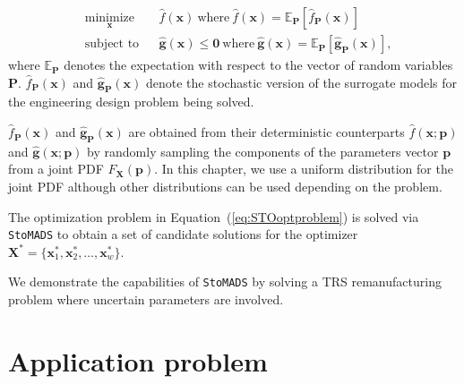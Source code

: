 \begin{equation}
	\begin{aligned}
		& \underset{\mathbf{x}}{\text{minimize}}
		& & \hat{f}(\mathbf{x})~\textrm{where}~\hat{f}(\mathbf{x})=\mathbb{E}_{\mathbf{P}}\left[\hat{f}_{\mathbf{P}}(\mathbf{x})\right]\\
		& \text{subject to}
		& & \hat{\mathbf{g}}(\mathbf{x}) \le \mathbf{0}~\textrm{where}~\hat{\mathbf{g}}(\mathbf{x})=\mathbb{E}_{\mathbf{P}}\left[\hat{\mathbf{g}}_{\mathbf{P}}(\mathbf{x})\right],
	\end{aligned}
	\label{eq:STOoptproblem}
\end{equation}
%
where $\mathbb{E}_{\mathbf{P}}$ denotes the expectation with respect to the vector of random variables $\mathbf{P}$. $\hat{f}_{\mathbf{P}}(\mathbf{x})$ and $\hat{\mathbf{g}}_{\mathbf{P}}(\mathbf{x})$ denote the stochastic version of the surrogate models for the engineering design problem being solved.

$\hat{f}_{\mathbf{P}}(\mathbf{x})$ and $\hat{\mathbf{g}}_{\mathbf{P}}(\mathbf{x})$ are obtained from their deterministic counterparts $\hat{f}(\mathbf{x};{\mathbf{p}})$ and $\hat{\mathbf{g}}(\mathbf{x};{\mathbf{p}})$ by randomly sampling the components of the parameters vector $\mathbf{p}$ from a joint \ac{PDF} $F_{\mathbf{X}}(\mathbf{p})$. In this chapter, we use a uniform distribution for the joint \ac{PDF} although other distributions can be used depending on the problem.

The optimization problem in Equation~(\ref{eq:STOoptproblem}) is solved via \texttt{StoMADS} to obtain a set of candidate solutions for the optimizer $\mathbf{X}^*=  \{ \mathbf{x}^*_1,\mathbf{x}^*_2,\ldots,\mathbf{x}^*_w \} $.

We demonstrate the capabilities of \texttt{StoMADS} by solving a \ac{TRS} remanufacturing problem where uncertain parameters are involved.

\section{Application problem} \label{sec:STOcasestudy}

